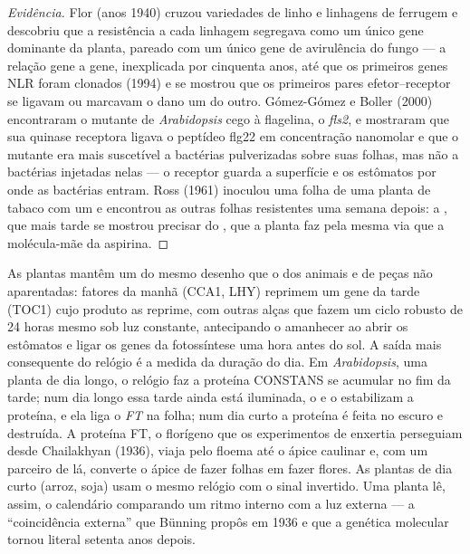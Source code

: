 \begin{proof}[Evidência]
Flor (anos 1940) cruzou variedades de linho e linhagens de ferrugem e
descobriu que a resistência a cada linhagem segregava como um único gene
dominante da planta, pareado com um único gene de avirulência do fungo
--- a relação gene a gene, inexplicada por cinquenta anos, até que os
primeiros genes NLR foram clonados (1994) e se mostrou que os primeiros
pares efetor--receptor se ligavam ou marcavam o dano um do outro.
Gómez-Gómez e Boller (2000) encontraram o mutante de \emph{Arabidopsis}
cego à flagelina, o \emph{fls2}, e mostraram que sua quinase receptora
ligava o peptídeo flg22 em concentração nanomolar e que o mutante era
mais suscetível a bactérias pulverizadas sobre suas folhas, mas não a
bactérias injetadas nelas --- o receptor guarda a superfície e os
estômatos por onde as bactérias entram. Ross (1961) inoculou uma folha de
uma planta de tabaco com um  e encontrou as outras folhas
resistentes uma semana depois: a , que
mais tarde se mostrou precisar do , que a planta faz pela
mesma via que a molécula-mãe da aspirina.
\end{proof}

\begin{example}\label{ex:b3:plant-molecular-physiology:clock}
As plantas mantêm um  do mesmo desenho que o dos
animais e de peças não aparentadas: fatores da manhã (CCA1, LHY)
reprimem um gene da tarde (TOC1) cujo produto as reprime, com outras
alças que fazem um ciclo robusto de 24 horas mesmo sob luz constante,
antecipando o amanhecer ao abrir os estômatos e ligar os genes da
fotossíntese uma hora antes do sol. A saída mais consequente do relógio é
a medida da duração do dia. Em \emph{Arabidopsis}, uma planta de dia
longo, o relógio faz a proteína CONSTANS se acumular no fim da tarde; num
dia longo essa tarde ainda está iluminada, o  e o 
estabilizam a proteína, e ela liga o \emph{FT} na folha; num dia curto a
proteína é feita no escuro e destruída. A proteína FT, o florígeno que os
experimentos de enxertia perseguiam desde Chailakhyan (1936), viaja pelo
floema até o ápice caulinar e, com um parceiro de lá, converte o ápice de
fazer folhas em fazer flores. As plantas de dia curto (arroz, soja) usam
o mesmo relógio com o sinal invertido. Uma planta lê, assim, o calendário
comparando um ritmo interno com a luz externa --- a ``coincidência
externa'' que Bünning propôs em 1936 e que a genética molecular tornou
literal setenta anos depois.
\end{example}

